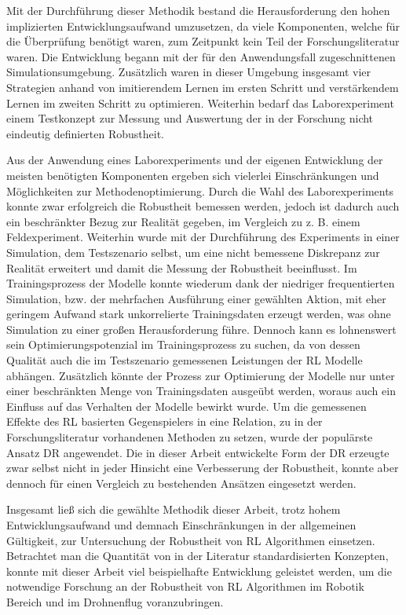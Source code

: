 Mit der Durchführung dieser Methodik bestand die Herausforderung den hohen implizierten Entwicklungsaufwand umzusetzen, da viele Komponenten, welche für die Überprüfung benötigt waren, zum Zeitpunkt kein Teil der Forschungsliteratur waren.
Die Entwicklung begann mit der für den Anwendungsfall zugeschnittenen Simulationsumgebung.
Zusätzlich waren in dieser Umgebung insgesamt vier Strategien anhand von imitierendem Lernen im ersten Schritt und verstärkendem Lernen im zweiten Schritt zu optimieren. 
Weiterhin bedarf das Laborexperiment einem Testkonzept zur Messung und Auswertung der in der Forschung nicht eindeutig definierten Robustheit.

Aus der Anwendung eines Laborexperiments und der eigenen Entwicklung der meisten benötigten Komponenten ergeben sich vielerlei Einschränkungen und Möglichkeiten zur Methodenoptimierung. %
Durch die Wahl des Laborexperiments konnte zwar erfolgreich die Robustheit bemessen werden, jedoch ist dadurch auch ein beschränkter Bezug zur Realität gegeben, im Vergleich zu z. B. einem Feldexperiment.
Weiterhin wurde mit der Durchführung des Experiments in einer Simulation, dem Testszenario selbst, um eine nicht bemessene Diskrepanz zur Realität erweitert und damit die Messung der Robustheit beeinflusst.
Im Trainingsprozess der Modelle konnte wiederum dank der niedriger frequentierten Simulation, bzw. der mehrfachen Ausführung einer gewählten Aktion, mit eher geringem Aufwand stark unkorrelierte Trainingsdaten erzeugt werden, was ohne Simulation zu einer großen Herausforderung führe.
Dennoch kann es lohnenswert sein Optimierungspotenzial im Trainingsprozess zu suchen, da von dessen Qualität auch die im Testszenario gemessenen Leistungen der RL Modelle abhängen.
Zusätzlich könnte der Prozess zur Optimierung der Modelle nur unter einer beschränkten Menge von Trainingsdaten ausgeübt werden, woraus auch ein Einfluss auf das Verhalten der Modelle bewirkt wurde.
Um die gemessenen Effekte des RL basierten Gegenspielers in eine Relation, zu in der Forschungsliteratur vorhandenen Methoden zu setzen, wurde der populärste Ansatz DR angewendet.
Die in dieser Arbeit entwickelte Form der DR erzeugte zwar selbst nicht in jeder Hinsicht eine Verbesserung der Robustheit, konnte aber dennoch für einen Vergleich zu bestehenden Ansätzen eingesetzt werden.

Insgesamt ließ sich die gewählte Methodik dieser Arbeit, trotz hohem Entwicklungsaufwand und demnach Einschränkungen in der allgemeinen Gültigkeit, zur Untersuchung der Robustheit von RL Algorithmen einsetzen.
Betrachtet man die Quantität von in der Literatur standardisierten Konzepten, konnte mit dieser Arbeit viel beispielhafte Entwicklung geleistet werden, um die notwendige Forschung an der Robustheit von RL Algorithmen im Robotik Bereich und im Drohnenflug voranzubringen.

